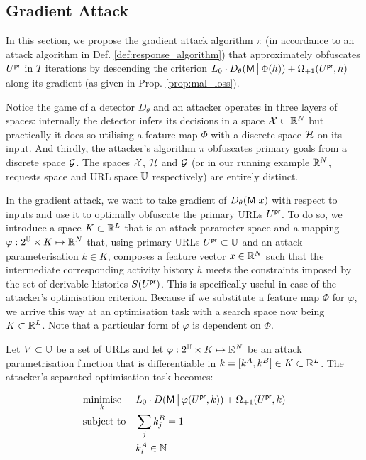 \subsection{Gradient Attack}\label{sec:gradient_attack}
In this section, we propose the gradient attack algorithm $\pi$ (in accordance to an attack algorithm in Def. \ref{def:response_algorithm}) that approximately obfuscates $U^{\mathsf{pr}}$ in $T$ iterations by descending the criterion $L_0 \cdot D_\theta(\mathsf{M} \,\big|\, \Phi(h)) + \Omega_{{\text{+}1}}(U^{\mathsf{pr}}, h)$ along its gradient (as given in Prop. \ref{prop:mal_loss}).

Notice the game of a detector $D_\theta$ and an attacker operates in three layers of spaces: internally the detector infers its decisions in a space $\mathcal{X} \subset \mathbb{R}^N$ but practically it does so utilising a feature map $\Phi$ with a discrete space $\mathcal{H}$ on its input. And thirdly, the attacker's algorithm $\pi$ obfuscates primary goals from a discrete space $\mathcal{G}$. The spaces $\mathcal{X}$, $\mathcal{H}$ and $\mathcal{G}$ (or in our running example $\mathbb{R}^N$, requests space and URL space $\mathbb{U}$ respectively) are entirely distinct.

In the gradient attack, we want to take gradient of $D_\theta(\mathsf{M} | x )$ with respect to inputs and use it to optimally obfuscate the primary URLs $U^{\mathsf{pr}}$. To do so, we introduce a space $K \subset \mathbb{R}^L$ that is an attack parameter space and a mapping $\varphi  :2^{\mathbb{U}} \times K \mapsto \mathbb{R}^N$ that, using primary URLs $U^{\mathsf{pr}} \subset \mathbb{U}$ and an attack parameterisation $k \in K$, composes a feature vector $x \in \mathbb{R}^N$ such that the intermediate corresponding activity history $h$ meets the constraints imposed by the set of derivable histories $S(U^{\mathsf{pr}})$. This is specifically useful in case of the attacker's optimisation criterion. Because if we substitute a feature map $\Phi$ for $\varphi$, we arrive this way at an optimisation task with a search space now being $K \subset \mathbb{R}^L$. Note that a particular form of $\varphi$ is dependent on $\Phi$.

\begin{proposition}\label{prop:differentiable_attacker}
    Let $V \subset \mathbb{U}$ be a set of URLs and let $\varphi  :2^{\mathbb{U}} \times K \mapsto \mathbb{R}^N$ be an attack parametrisation function that is differentiable in $k = [k^A, k^B] \in K \subset \mathbb{R}^L$. The attacker's separated optimisation task becomes:

    \begin{equation*}
        \begin{aligned}
        & \underset{k} {\text{minimise}}
        & & L_0 \cdot D(\mathsf{M} \,\big|\, \varphi (U^{\mathsf{pr}}, k)) + \Omega_{{\text{+}1}}(U^{\mathsf{pr}}, k) \\
        & \text{subject to}
        & & \sum_j k_j^B = 1 \\
        & & & k_i^A \in \mathbb{N}
        \end{aligned}
    \end{equation*}

\end{proposition}

